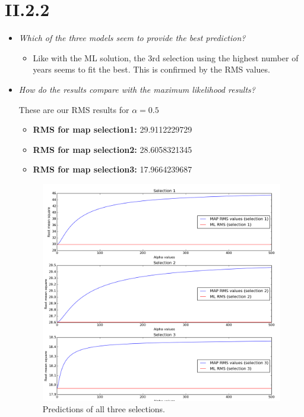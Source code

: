\documentclass[12pt, a4paper]{article}
\begin{document}
\section{II.2.2}
\begin{itemize}
\item \textit{Which of the three models seem to provide
the best prediction?}

	\begin{itemize}
		\item Like with the ML solution, the 3rd selection using the highest number of years seems to fit the best. This is confirmed by the RMS values.
	\end{itemize}
\item \textit{How do the results compare with the maximum likelihood
results?}

	These are our RMS results for $\alpha = 0.5$
	\begin{itemize}
		\item \textbf{RMS for map selection1:} 29.9112229729
		\item \textbf{RMS for map selection2:} 28.6058321345
		\item \textbf{RMS for map selection3:} 17.9664239687
	\end{itemize}
	
	\begin{figure}[H]
		\centering
		\includegraphics[scale=0.5]{rms_values.png}
		\caption{Predictions of all three selections.}
	\end{figure}	
	

\end{itemize}
\end{document}
